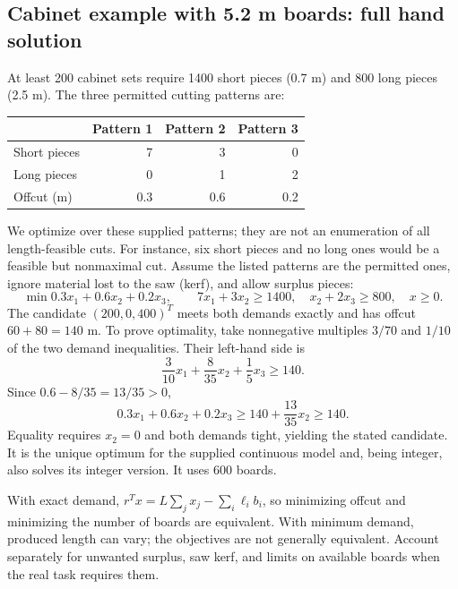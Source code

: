 \documentclass[11pt,a4paper]{article}
\begin{document}
\subsection{Cabinet example with 5.2 m boards: full hand solution}
At least 200 cabinet sets require 1400 short pieces (0.7 m) and 800 long pieces
(2.5 m). The three permitted cutting patterns are:
\begin{center}
  \begin{tabular}{lrrr}\toprule
    & Pattern 1 & Pattern 2 & Pattern 3\\\midrule
    Short pieces & 7 & 3 & 0\\
    Long pieces & 0 & 1 & 2\\
    Offcut (m) & 0.3 & 0.6 & 0.2\\\bottomrule
  \end{tabular}
\end{center}


We optimize over these supplied patterns; they are not an enumeration of all
length-feasible cuts. For instance, six short pieces and no long ones would be
a feasible but nonmaximal cut. Assume the listed patterns are the permitted ones,
ignore material lost to the saw (kerf), and allow surplus pieces:
\[
  \min 0.3x_1+0.6x_2+0.2x_3,\qquad
  7x_1+3x_2\geq1400,\quad x_2+2x_3\geq800,\quad x\geq0.
\]
The candidate $(200,0,400)^T$ meets both demands exactly and has offcut
$60+80=140$ m. To prove optimality, take nonnegative multiples $3/70$ and $1/10$
of the two demand inequalities. Their left-hand side is
\[
  \frac3{10}x_1+\frac8{35}x_2+\frac15x_3\geq140.
\]
Since $0.6-8/35=13/35>0$,
\[
  0.3x_1+0.6x_2+0.2x_3\geq140+\frac{13}{35}x_2\geq140.
\]
Equality requires $x_2=0$ and both demands tight, yielding the stated candidate.
It is the unique optimum for the supplied continuous model and, being integer,
also solves its integer version. It uses 600 boards.

\begin{remark}
  With exact demand, $r^Tx=L\sum_jx_j-\sum_i\ell_i b_i$, so minimizing offcut
  and minimizing the number of boards are equivalent. With minimum demand, produced length
  can vary; the objectives are not generally equivalent. Account separately for
  unwanted surplus, saw kerf, and limits on available boards when the real task requires them.
\end{remark}
\end{document}
